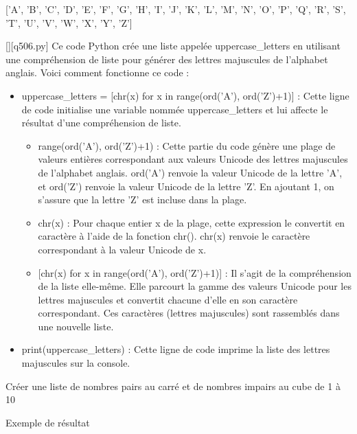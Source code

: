 ['A', 'B', 'C', 'D', 'E', 'F', 'G', 'H', 'I', 'J', 'K', 'L', 'M', 'N', 'O', 'P', 'Q', 'R', 'S', 'T', 'U', 'V', 'W', 'X', 'Y', 'Z']
        \par
        \begin{solution}
            \renewcommand{\nomfichier}{q506.py}
            \pythonfile{\chemincode \nomfichier}[][\nomfichier]
            Ce code Python crée une liste appelée uppercase\_letters en utilisant une compréhension de liste pour générer des lettres majuscules de l'alphabet anglais. Voici comment fonctionne ce code :\par

\begin{itemize}
\item     uppercase\_letters = [chr(x) for x in range(ord('A'), ord('Z')+1)] : Cette ligne de code initialise une variable nommée uppercase\_letters et lui affecte le résultat d'une compréhension de liste.

 \begin{itemize}
 \item        range(ord('A'), ord('Z')+1) : Cette partie du code génère une plage de valeurs entières correspondant aux valeurs Unicode des lettres majuscules de l'alphabet anglais. ord('A') renvoie la valeur Unicode de la lettre 'A', et ord('Z') renvoie la valeur Unicode de la lettre 'Z'. En ajoutant 1, on s'assure que la lettre 'Z' est incluse dans la plage.
 \item         chr(x) : Pour chaque entier x de la plage, cette expression le convertit en caractère à l'aide de la fonction chr(). chr(x) renvoie le caractère correspondant à la valeur Unicode de x.
 \item{}         [chr(x) for x in range(ord('A'), ord('Z')+1)] : Il s'agit de la compréhension de la liste elle-même. Elle parcourt la gamme des valeurs Unicode pour les lettres majuscules et convertit chacune d'elle en son caractère correspondant. Ces caractères (lettres majuscules) sont rassemblés dans une nouvelle liste.
 \end{itemize}
\item    print(uppercase\_letters) : Cette ligne de code imprime la liste des lettres majuscules sur la console.
 \end{itemize}
        \end{solution}
        

        \question
        Créer une liste de nombres pairs au carré et de nombres impairs au cube de 1 à 10

Exemple de résultat


